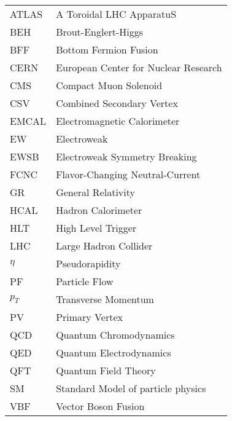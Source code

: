 \hspace*{-1.25in}
\vspace{12pt}
\begin{spacing}{1.0}
	\begin{longtable}[htbp]{@{}p{} p{}@{}}
		ATLAS	&	A Toroidal LHC ApparatuS\\	[2ex]
		BEH	&	Brout-Englert-Higgs\\	[2ex]
		BFF	&	Bottom Fermion Fusion\\	[2ex]
		CERN & European Center for Nuclear Research\\ [2ex]
		CMS	&	Compact Muon Solenoid\\	[2ex]		
		CSV	&	Combined Secondary Vertex\\	[2ex]				
		EMCAL & Electromagnetic Calorimeter\\ [2ex]
		EW	&	Electroweak\\	[2ex]
		EWSB	&	Electroweak Symmetry Breaking\\	[2ex]	
		FCNC &  Flavor-Changing Neutral-Current\\  [2ex]
		GR &  General Relativity\\  [2ex]		
		HCAL & Hadron Calorimeter\\ [2ex]
		HLT  & High Level Trigger\\ [2ex]	
		LHC  & Large Hadron Collider\\ [2ex]
		$\eta$ & Pseudorapidity\\ [2ex]
		PF   & Particle Flow\\ [2ex]
		$p_{T}$ & Transverse Momentum\\ [2ex]		
		PV & Primary Vertex\\ [2ex]				
		QCD	&	Quantum Chromodynamics\\	[2ex]
		QED	&	Quantum Electrodynamics\\	[2ex]		
		QFT	&	Quantum Field Theory\\	[2ex]
		SM	&	Standard Model of particle physics\\	[2ex]
		VBF	&	Vector Boson Fusion\\	[2ex]
	\end{longtable}
\end{spacing}

\pagebreak{}